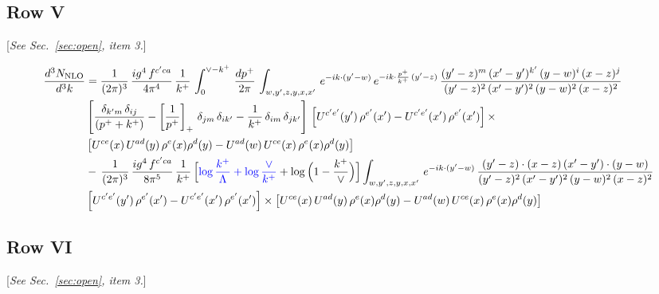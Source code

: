 \documentclass[9pt]{article}
\numberwithin{equation}{section}
\newcommand{\rnote}[1]{{\color{teal}[\textit{#1}]}}
\begin{document}
\subsection{Row V}

\rnote{See Sec.~\ref{sec:open}, item 3.}

\begin{align}
    \frac{d^{3}N_{\rm NLO}}{d^{3}k} & = \frac{1}{(2\pi)^{3}}\, \frac{ig^{4}\,f^{c'ca}}{4\pi^{4}}\, \frac{1}{k^{+}}\,\int_{0}^{\vee-k^{+}}\, \frac{dp^{+}}{2\pi}\, \int_{w,y',z,y,x,x'}\, e^{-ik\cdot (y'-w)}\, e^{-ik\cdot \frac{p^{+}}{k^{+}}\,(y'-z)}\,\frac{(y'-z)^{m}\,(x'-y')^{k'}\,(y-w)^{i}\,(x-z)^{j}}{(y'-z)^{2}\,(x'-y')^{2}\,(y-w)^{2}\,(x-z)^{2}}\notag \\ & \left[\frac{\delta_{k'm}\,\delta_{ij}}{(p^{+}+k^{+})}-\left[\frac{1}{p^{+}}\right]_{+}\,\delta_{jm}\,\delta_{ik'}-\frac{1}{k^{+}}\, \delta_{im}\, \delta_{jk'}\right]\, \left[U^{c'e'}(y')\,\rho^{e'}(x')-U^{c'e'}(x')\,\rho^{e'}(x')\right]\times \notag \\ &  \left[U^{ce}(x)\,U^{ad}(y)\,\rho^{e}(x)\rho^{d}(y)-U^{ad}(w)\,U^{ce}(x)\,\rho^{e}(x)\rho^{d}(y)\right]\notag \\ & -\,\frac{1}{(2\pi)^{3}}\, \frac{ig^{4}\,f^{c'ca}}{8\pi^{5}}\, \frac{1}{k^{+}}\,\Big[{\color{blue}\log\frac{k^{+}}{\Lambda}+\log\frac{\vee}{k^{+}}}+\log\Big(1-\frac{k^{+}}{\vee}\Big)\Big] \int_{w,y',z,y,x,x'}\, e^{-ik\cdot (y'-w)}\,\frac{(y'-z)\cdot (x-z)\,(x'-y')\cdot (y-w)}{(y'-z)^{2}\,(x'-y')^{2}\,(y-w)^{2}\,(x-z)^{2}}\notag \\ & \left[U^{c'e'}(y')\,\rho^{e'}(x')-U^{c'e'}(x')\,\rho^{e'}(x')\right]\times  \left[U^{ce}(x)\,U^{ad}(y)\,\rho^{e}(x)\rho^{d}(y)-U^{ad}(w)\,U^{ce}(x)\,\rho^{e}(x)\rho^{d}(y)\right]
\end{align}

\subsection{Row VI}

\rnote{See Sec.~\ref{sec:open}, item 3.}
\end{document}

